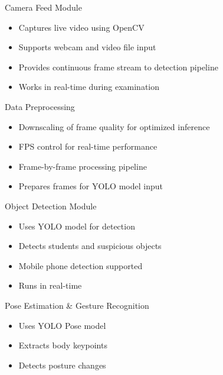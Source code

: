 \documentclass{beamer}
\begin{document}
\begin{frame}{Camera Feed Module}
\begin{itemize}
    \item Captures live video using OpenCV
    \item Supports webcam and video file input
    \item Provides continuous frame stream to detection pipeline
    \item Works in real-time during examination
\end{itemize}
\end{frame}

\begin{frame}{Data Preprocessing}
\begin{itemize}
    \item Downscaling of frame quality for optimized inference
    \item FPS control for real-time performance
    \item Frame-by-frame processing pipeline
    \item Prepares frames for YOLO model input
\end{itemize}
\end{frame}

\begin{frame}{Object Detection Module}
\begin{itemize}
    \item Uses YOLO model for detection
    \item Detects students and suspicious objects
    \item Mobile phone detection supported
    \item Runs in real-time
\end{itemize}
\end{frame}

\begin{frame}{Pose Estimation \& Gesture Recognition}
\begin{itemize}
    \item Uses YOLO Pose model
    \item Extracts body keypoints
    \item Detects posture changes
\end{itemize}
\end{frame}
\end{document}
